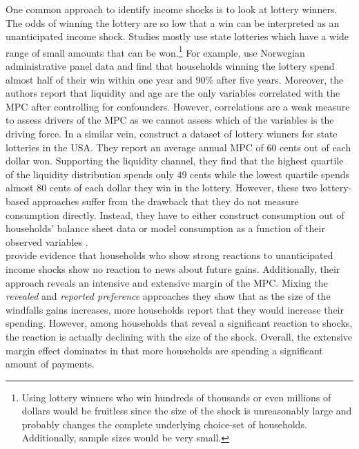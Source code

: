 One common approach to identify income shocks is to look at lottery winners. The odds of winning the lottery are so low that a win can be interpreted as an unanticipated income shock. Studies mostly use state lotteries which have a wide range of small amounts that can be won.\footnote{Using lottery winners who win hundreds of thousands or even millions of dollars would be fruitless since the size of the shock is unreasonably large and probably changes the complete underlying choice-set of households. Additionally, sample sizes would be very small.} For example, \cite{fagerengetal_2018} use Norwegian administrative panel data and find that households winning the lottery spend almost half of their win within one year and 90\% after five years. Moreover, the authors report that liquidity and age are the only variables correlated with the MPC after controlling for confounders. However, correlations are a weak measure to assess drivers of the MPC as we cannot assess which of the variables is the driving force. In a similar vein, \cite{golosovetal_2021} construct a dataset of lottery winners for state lotteries in the USA. They report an average annual MPC of 60 cents out of each dollar won. Supporting the liquidity channel, they find that the highest quartile of the liquidity distribution spends only 49 cents while the lowest quartile spends almost 80 cents of each dollar they win in the lottery. However, these two lottery-based approaches suffer from the drawback that they do not measure consumption directly. Instead, they have to either construct consumption out of households' balance sheet data \citep{fagerengetal_2018} or model consumption as a function of their observed variables \citep{golosovetal_2021}. \\
\cite{fusteretal_2021} provide evidence that households who show strong reactions to unanticipated income shocks show no reaction to news about future gains. Additionally, their approach reveals an intensive and extensive margin of the MPC. Mixing the \textit{revealed} and \textit{reported preference} approaches they show that as the size of the windfalls gains increases, more households report that they would increase their spending. However, among households that reveal a significant reaction to shocks, the reaction is actually declining with the size of the shock. Overall, the extensive margin effect dominates in that more households are spending a significant amount of payments. \\
